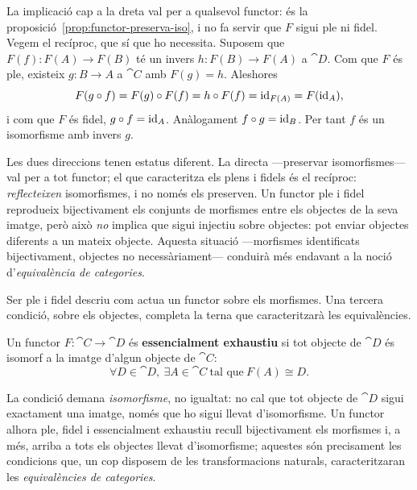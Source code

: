 \begin{prova}
La implicació cap a la dreta val per a qualsevol functor: és la proposició~\ref{prop:functor-preserva-iso}, i no fa servir que $F$ sigui ple ni fidel. Vegem el recíproc, que sí que ho necessita. Suposem que $F(f)\colon F(A)\to F(B)$ té un invers $h\colon F(B)\to F(A)$ a $\cat{D}$. Com que $F$ és ple, existeix $g\colon B\to A$ a $\cat{C}$ amb $F(g)=h$. Aleshores
\[
F(g\circ f)=F(g)\circ F(f)=h\circ F(f)=\operatorname{id}_{F(A)}=F(\operatorname{id}_A),
\]
i com que $F$ és fidel, $g\circ f=\operatorname{id}_A$. Anàlogament $f\circ g=\operatorname{id}_B$. Per tant $f$ és un isomorfisme amb invers $g$.
\end{prova}

\begin{observacio}
Les dues direccions tenen estatus diferent. La directa ---preservar isomorfismes--- val per a tot functor; el que caracteritza els plens i fidels és el recíproc: \emph{reflecteixen} isomorfismes, i no només els preserven. Un functor ple i fidel reprodueix bijectivament els conjunts de morfismes entre els objectes de la seva imatge, però això \emph{no} implica que sigui injectiu sobre objectes: pot enviar objectes diferents a un mateix objecte. Aquesta situació ---morfismes identificats bijectivament, objectes no necessàriament--- conduirà més endavant a la noció d'\emph{equivalència de categories}.
\end{observacio}

Ser ple i fidel descriu com actua un functor sobre els morfismes. Una tercera condició, sobre els objectes, completa la terna que caracteritzarà les equivalències.

\begin{definicio}\label{def:ess-exhaustiu}
Un functor $F\colon\cat{C}\to\cat{D}$ és \textbf{essencialment exhaustiu} si tot objecte de $\cat{D}$ és isomorf a la imatge d'algun objecte de $\cat{C}$:
\[
\forall D\in\cat{D},\ \exists A\in\cat{C}\ \text{tal que}\ F(A)\cong D.
\]
\end{definicio}

\begin{observacio}
La condició demana \emph{isomorfisme}, no igualtat: no cal que tot objecte de $\cat{D}$ sigui exactament una imatge, només que ho sigui llevat d'isomorfisme. Un functor alhora ple, fidel i essencialment exhaustiu recull bijectivament els morfismes i, a més, arriba a tots els objectes llevat d'isomorfisme; aquestes són precisament les condicions que, un cop disposem de les transformacions naturals, caracteritzaran les \emph{equivalències de categories}.
\end{observacio}

